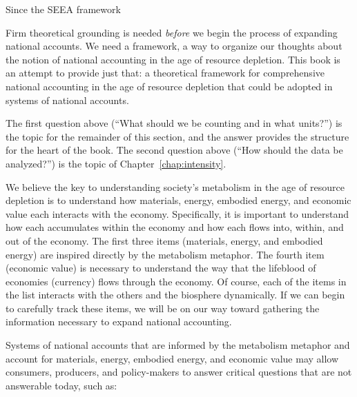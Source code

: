 Since the SEEA framework 

Firm theoretical grounding is needed 
\emph{before} we begin the process of expanding national accounts.
We need a framework, a way to organize our thoughts about the notion 
of national accounting in the age of resource depletion.
This book is an attempt to provide just that: 
a theoretical framework
for comprehensive national accounting
in the age of resource depletion
that could be adopted in systems of national accounts.

The first question above (``What should we be counting and in what units?'') 
is the topic for the remainder of this section,
and the answer provides the structure for the heart of the book.
The second question above (``How should the data be analyzed?'')
is the topic of Chapter~\ref{chap:intensity}.

We believe the key to understanding society's metabolism
in the age of resource depletion is to understand how 
materials, energy, embodied energy, and economic value
each interacts with the economy.
Specifically, it is important to understand how each
accumulates within the economy and how each flows into, within, and out of the economy.
The first three items (materials, energy, and embodied energy) are
inspired directly by the metabolism metaphor.
The fourth item (economic value) is necessary to understand the way 
that the lifeblood of economies (currency) flows through the economy.
Of course, each of the items in the list interacts with the others 
and the biosphere dynamically.
If we can begin to carefully track these items, 
we will be on our way toward gathering the information necessary to 
expand national accounting.

Systems of national accounts that are informed by the metabolism metaphor 
and account for materials, energy, embodied energy, and economic value
may allow consumers, producers,
and policy-makers to answer critical questions that are not
answerable today, such as:

